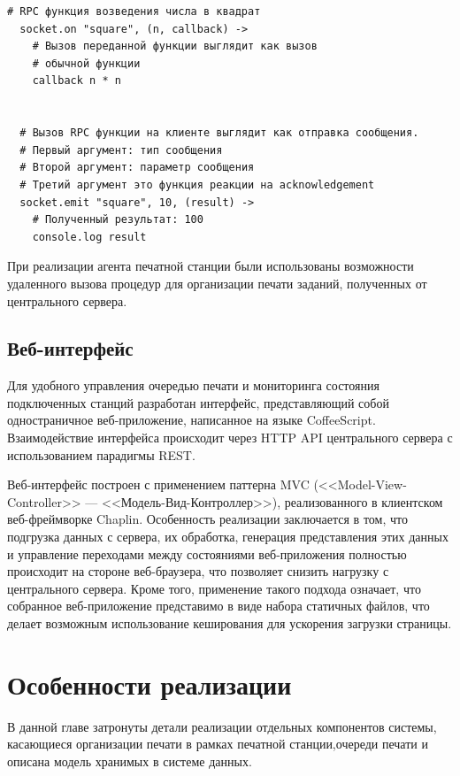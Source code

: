 \documentclass[a4paper,14pt,href]{article}
\begin{document}
\begin{lstlisting}[caption=Удаленный вызов процедур в socket.io, label=lst:rpc]
  # RPC функция возведения числа в квадрат
  socket.on "square", (n, callback) ->
    # Вызов переданной функции выглядит как вызов
    # обычной функции
    callback n * n


  # Вызов RPC функции на клиенте выглядит как отправка сообщения.
  # Первый аргумент: тип сообщения
  # Второй аргумент: параметр сообщения
  # Третий аргумент это функция реакции на acknowledgement
  socket.emit "square", 10, (result) ->
    # Полученный результат: 100
    console.log result
\end{lstlisting}

При реализации агента печатной станции были использованы возможности удаленного вызова процедур для организации печати
заданий, полученных от центрального сервера.

\subsection{Веб-интерфейс}
Для удобного управления очередью печати и мониторинга состояния подключенных станций разработан интерфейс, представляющий
собой одностраничное веб-приложение, написанное на языке CoffeeScript. Взаимодействие интерфейса происходит через HTTP API
центрального сервера с использованием парадигмы REST.

Веб-интерфейс построен с применением паттерна MVC (<<Model-View-Controller>> --- <<Модель-Вид-Контроллер>>)\cite{ScalingIsomorphic},
реализо\-ван\-но\-го в клиентском веб-фреймворке Chaplin\cite{ChaplinJS}. Особенность реализации заключается в том, что
подгрузка данных с сервера, их обработка, генерация представления этих данных и управление переходами между состояниями
веб-приложения полностью происходит на стороне веб-браузера, что позволяет снизить нагрузку с центрального сервера.
Кроме того, применение такого подхода означает, что собранное веб-приложение представимо в виде набора статичных файлов,
что делает возможным использование кеширования для ускорения загрузки страницы.

\newpage
\section{Особенности реализации}
В данной главе затронуты детали реализации отдельных компонентов системы, касающиеся организации печати в рамках
печатной станции,очереди печати и описана модель хранимых в системе данных.
\end{document}
